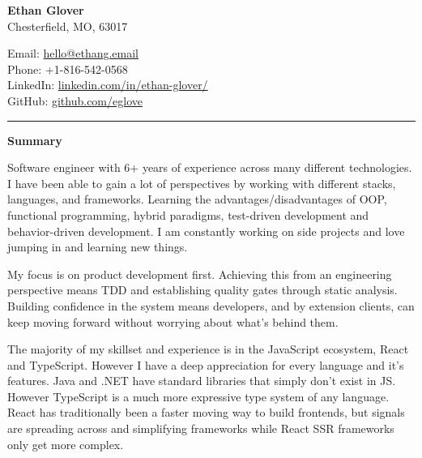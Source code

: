 \documentclass[a4ppaper, 10pt]{article}
\newcommand{\heading}[1]{\vspace{6pt}\noindent\textbf{\large #1}\vspace{4pt}\\}
\begin{document}
	\begin{center}
		{\LARGE \textbf{Ethan Glover}} \\
		Chesterfield, MO, 63017
		\begin{multicols}{2}
			\raggedright
			Email: \href{mailto:hello@ethang.email}{hello@ethang.email} \\
			Phone: +1-816-542-0568 \\
			LinkedIn: \href{https://www.linkedin.com/in/ethan-glover/}{linkedin.com/in/ethan-glover/} \\
			GitHub: \href{https://github.com/eglove}{github.com/eglove}
		\end{multicols}
	\end{center}
	
	\hrule
	
	\heading{Summary}
	\raggedright
	Software engineer with 6+ years of experience across many different technologies. I have been able to gain a lot of perspectives by working with different stacks, languages, and frameworks. Learning the advantages/disadvantages of OOP, functional programming, hybrid paradigms, test-driven development and behavior-driven development. I am constantly working on side projects and love jumping in and learning new things.
	
	\vspace{1em}
	
	My focus is on product development first. Achieving this from an engineering perspective means TDD and establishing quality gates through static analysis. Building confidence in the system means developers, and by extension clients, can keep moving forward without worrying about what's behind them.
	
	\vspace{1em}
	
	The majority of my skillset and experience is in the JavaScript ecosystem, React and TypeScript. However I have a deep appreciation for every language and it's features. Java and .NET have standard libraries that simply don't exist in JS. However TypeScript is a much more expressive type system of any language. React has traditionally been a faster moving way to build frontends, but signals are spreading across and simplifying frameworks while React SSR frameworks only get more complex.
	
\end{document}
